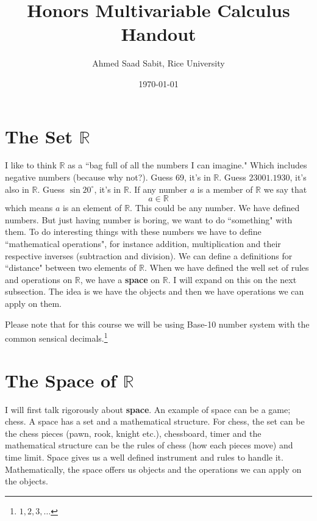 \documentclass[letter]{article}
\title{Honors Multivariable Calculus Handout }
\author{Ahmed Saad Sabit, Rice University}
\date{\today}
\begin{document}
\maketitle

\section*{The Set $\mathbb{R}$ } 
\textsf{I like to think $\mathbb{R}$ as a ``bag full of all the numbers I can imagine." Which includes negative numbers (because why not?).
\newline
Guess 69, it's in $\mathbb{R}$. Guess $23001.1930$, it's also in $\mathbb{R}$. Guess $\sin 20^{\circ}$, it's in $\mathbb{R}$. If any number $a$ is a member of $\mathbb{R}$ we say that 
\[
a \in \mathbb{R}
\] 
which means $a$ is an element of $\mathbb{R}$. This could be any number. 
\newline
We have defined numbers. But just having number is boring, we want to do ``something" with them. To do interesting things with these numbers we have to define ``mathematical operations", for instance addition, multiplication and their respective inverses (subtraction and division). We can define a definitions for ``distance" between two elements of $\mathbb{R}$. When we have defined the well set of rules and operations on $\mathbb{R}$, we have a \textbf{space} on $\mathbb{R}$. I will expand on this on the next subsection.   
\newline
The idea is we have the objects and then we have operations we can apply on them.
}


Please note that for this course we will be using Base-10 number system with the common sensical decimals.\footnote{$1,2,3,\ldots$}











\section*{The Space of $\mathbb{R}$ }

\textsf{I will first talk rigorously about \textbf{space}. An example of space can be a game; chess. A space has a set and a mathematical structure. For chess, the set can be the chess pieces (pawn, rook, knight etc.), chessboard, timer and the mathematical structure can be the rules of chess (how each pieces move) and time limit. Space gives us a well defined instrument and rules to handle it. Mathematically, the space offers us objects and the operations we can apply on the objects.  }
\end{document}
